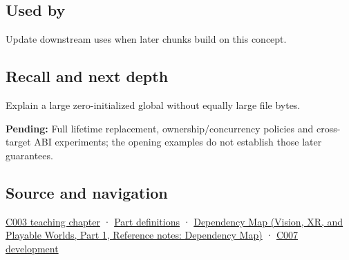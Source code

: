 \subsection{Used by}\label{appendix-17c93c4c2f19-used-by}

\hypertarget{appendix-17c93c4c2f19-used-by}{}

Update downstream uses when later chunks build on this concept.

\subsection{Recall and next depth}\label{appendix-17c93c4c2f19-recall-and-next-depth}

\hypertarget{appendix-17c93c4c2f19-recall-and-next-depth}{}

Explain a large zero-initialized global without equally large file bytes.

\textbf{Pending:} Full lifetime replacement, ownership/concurrency policies and cross-target ABI experiments; the opening examples do not establish those later guarantees.

\subsection{Source and navigation}\label{appendix-17c93c4c2f19-source-and-navigation}

\hypertarget{appendix-17c93c4c2f19-source-and-navigation}{}

\hyperref[01-foundations-i-ch002-where-the-bytes-live]{C003 teaching chapter} · \hyperref[appendix-fd090d982a15-m003---parts-41-60]{Part definitions} · \href{../07-Vision-XR-and-Playable-Worlds-P01/main.pdf\#nameddest=appendix-4ad47bdd269a}{Dependency Map (Vision, XR, and Playable Worlds, Part 1, Reference notes: Dependency Map)} · \hyperref[01-foundations-i-ch002-a-name-does-not-decide-how-long-storage-lasts]{C007 development}
